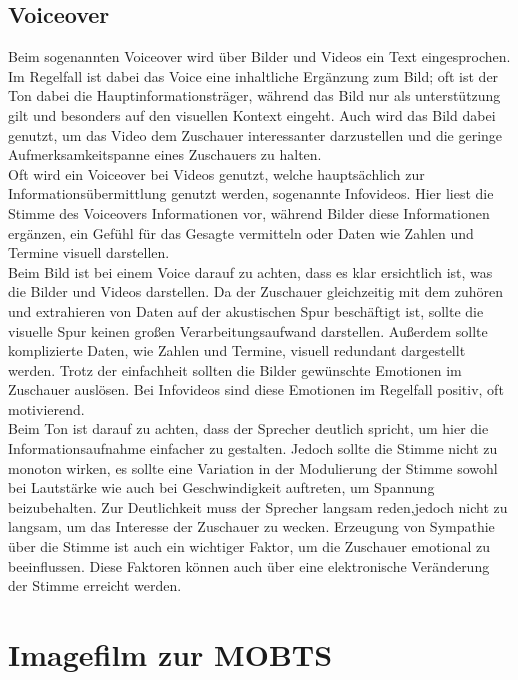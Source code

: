 \subsection{Voiceover}
Beim sogenannten Voiceover wird über Bilder und Videos ein Text eingesprochen. Im Regelfall ist dabei das Voice eine inhaltliche Ergänzung zum Bild; oft ist der Ton dabei die Hauptinformationsträger, während das Bild nur als unterstützung gilt und besonders auf den visuellen Kontext eingeht. \autocite{Schmidt.2013} Auch wird das Bild dabei genutzt, um das Video dem Zuschauer interessanter darzustellen und die geringe Aufmerksamkeitspanne eines Zuschauers zu halten.\\
Oft wird ein Voiceover bei Videos genutzt, welche hauptsächlich zur Informationsübermittlung genutzt werden, sogenannte Infovideos. Hier liest die Stimme des Voiceovers Informationen vor, während Bilder diese Informationen ergänzen, ein Gefühl für das Gesagte vermitteln oder Daten wie Zahlen und Termine visuell darstellen.\\
Beim Bild ist bei einem Voice darauf zu achten, dass es klar ersichtlich ist, was die Bilder und Videos darstellen. Da der Zuschauer gleichzeitig mit dem zuhören und extrahieren von Daten auf der akustischen Spur beschäftigt ist, sollte die visuelle Spur keinen großen Verarbeitungsaufwand darstellen. Außerdem sollte komplizierte Daten, wie Zahlen und Termine, visuell redundant dargestellt werden. Trotz der einfachheit sollten die Bilder gewünschte Emotionen im Zuschauer auslösen. Bei Infovideos sind diese Emotionen im Regelfall positiv, oft motivierend.\\
Beim Ton ist darauf zu achten, dass der Sprecher deutlich spricht, um hier die Informationsaufnahme einfacher zu gestalten. Jedoch sollte die Stimme nicht zu monoton wirken, es sollte eine Variation in der Modulierung der Stimme sowohl bei Lautstärke wie auch bei Geschwindigkeit auftreten, um Spannung beizubehalten. Zur Deutlichkeit muss der Sprecher langsam reden,jedoch nicht zu langsam, um das Interesse der Zuschauer zu wecken. Erzeugung von Sympathie über die Stimme ist auch ein wichtiger Faktor, um die Zuschauer emotional zu beeinflussen. Diese Faktoren können auch über eine elektronische Veränderung der Stimme erreicht werden. 
\section{Imagefilm zur MOBTS}
